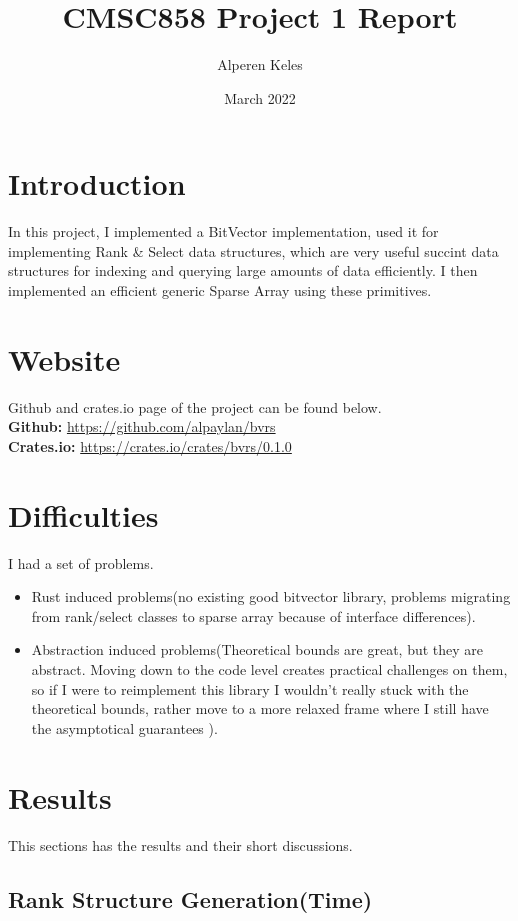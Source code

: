 \documentclass{report}
\title{CMSC858 Project 1 Report}
\author{Alperen Keles }
\date{March 2022}
\begin{document}
\maketitle

\section*{Introduction}
In this project, I implemented a BitVector implementation, used it for implementing Rank \& Select data structures, which are very useful succint data structures for indexing and querying large amounts of data efficiently. I then implemented an efficient generic Sparse Array using these primitives.
\section*{Website}
Github and crates.io page of the project can be found below. \\
\textbf{Github: } \hyperlink{https://github.com/alpaylan/bvrs}{https://github.com/alpaylan/bvrs} \\
\textbf{Crates.io: } \hyperlink{https://crates.io/crates/bvrs/0.1.0}{https://crates.io/crates/bvrs/0.1.0}
\section*{Difficulties}
I had a set of problems.
\begin{itemize}
    \item Rust induced problems(no existing good bitvector library, problems migrating from rank/select classes to sparse array because of interface differences).
    \item Abstraction induced problems(Theoretical bounds are great, but they are abstract. Moving down to the code level creates practical challenges on them, so if I were to reimplement this library I wouldn't really stuck with the theoretical bounds, rather move to a more relaxed frame where I still have the asymptotical guarantees ).
\end{itemize}
\section*{Results}
This sections has the results and their short discussions.
\newpage

\subsection*{Rank Structure Generation(Time)}
\end{document}
